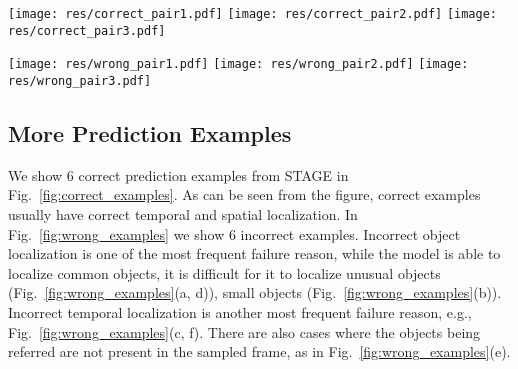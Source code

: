 \documentclass[11pt,a4paper]{article}
\begin{document}
\begin{figure*}[t]
  \texttt{[image: res/correct\_pair1.pdf]}
  \texttt{[image: res/correct\_pair2.pdf]}
  \texttt{[image: res/correct\_pair3.pdf]}
  \caption{Correct prediction examples from STAGE. The span predictions are shown on the top of each example, each block represents a frame, the color indicates the model's confidence for the predicted spans. For each QA, we show grounding examples and scores for one frame in GT span, GT boxes are shown in green. Model predicted answers are labeled by \underline{Pred}, GT answers are labeled by \underline{GT}.}
  \label{fig:correct_examples}
\end{figure*} 


\begin{figure*}[t]
  \texttt{[image: res/wrong\_pair1.pdf]}
  \texttt{[image: res/wrong\_pair2.pdf]}
  \texttt{[image: res/wrong\_pair3.pdf]}
  \caption{Wrong prediction examples from STAGE. The span predictions are shown on the top of each example, each block represents a frame, the color indicates the model's confidence for the predicted spans. For each QA, we show grounding examples and scores for one frame in GT span, GT boxes are shown in green. Model predicted answers are labeled by \underline{Pred}, GT answers are labeled by \underline{GT}.}
  \label{fig:wrong_examples}
\end{figure*}


\subsection{More Prediction Examples}
We show 6 correct prediction examples from STAGE in Fig.~\ref{fig:correct_examples}. As can be seen from the figure, correct examples usually have correct temporal and spatial localization. In Fig.~\ref{fig:wrong_examples} we show 6 incorrect examples. Incorrect object localization is one of the most frequent failure reason, while the model is able to localize common objects, it is difficult for it to localize unusual objects (Fig.~\ref{fig:wrong_examples}(a, d)), small objects (Fig.~\ref{fig:wrong_examples}(b)). Incorrect temporal localization is another most frequent failure reason, e.g., Fig.~\ref{fig:wrong_examples}(c, f). There are also cases where the objects being referred are not present in the sampled frame, as in Fig.~\ref{fig:wrong_examples}(e). 
\end{document}
